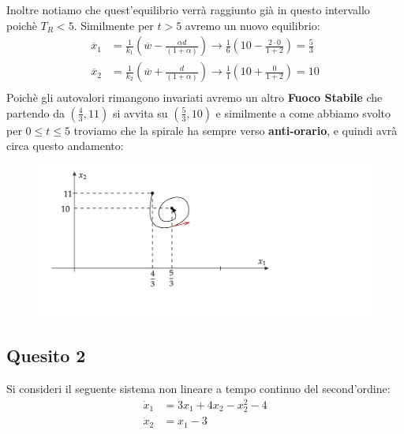 \documentclass[a4paper]{report}
\begin{document}
Inoltre notiamo che quest'equilibrio verrà raggiunto già in questo intervallo poichè $T_R<5$.
 \bigskip\newline
\medskip\newline
Similmente per $t>5$ avremo un nuovo equilibrio:
\begin{align*}
\overline{x}_1&=\frac{1}{k_1}\left(\overline{w}-\frac{\alpha d}{(1+\alpha)}\right)\longrightarrow\frac{1}{6}\left(10-\frac{2\cdot 0}{1+2}\right)=\frac{5}{3}\\
\overline{x}_2&=\frac{1}{k_2}\left(\overline{w}+\frac{d}{(1+\alpha)}\right)\longrightarrow\frac{1}{1}\left(10+\frac{0}{1+2}\right)=10\\
\end{align*}\newpage
Poichè gli autovalori rimangono invariati avremo un altro \textbf{Fuoco Stabile} che partendo da $\left(\frac{4}{3},11\right)$ si avvita su $\left(\frac{5}{3},10\right)$ e similmente a come abbiamo svolto per $0\leq t\leq 5$ troviamo che la spirale ha sempre verso \textbf{anti-orario}, e quindi avrà circa questo andamento:
\begin{figure}[h]
\includegraphics[width=\textwidth]{diagtj2}
\end{figure}
\subsection*{Quesito 2}
Si consideri il seguente sistema non lineare a tempo continuo del second’ordine:
\begin{align*}
\dot{x}_1&=3x_1+4x_2-x_2^2-4\\
\dot{x}_2&=x_1-3
\end{align*}
\end{document}
